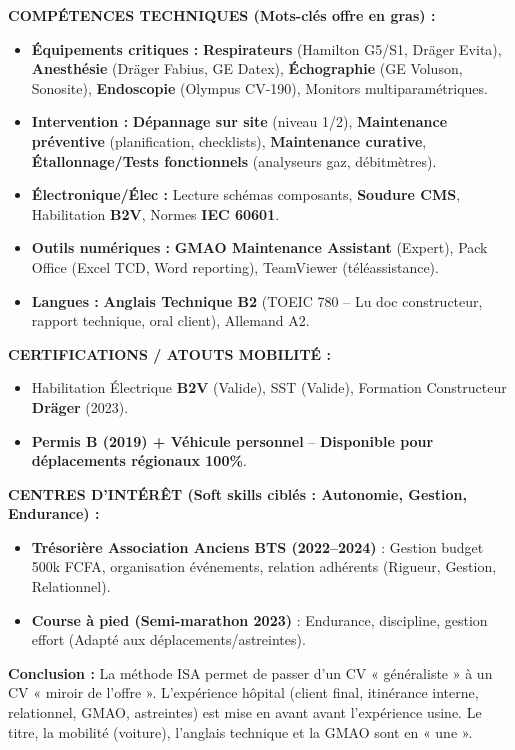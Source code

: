 \documentclass[11pt]{article}
\begin{document}
\begin{exoresolu}
    \textbf{COMPÉTENCES TECHNIQUES (Mots-clés offre en \textbf{gras}) :}
    \begin{itemize}
        \item \textbf{Équipements critiques :} \textbf{Respirateurs} (Hamilton G5/S1, Dräger Evita), \textbf{Anesthésie} (Dräger Fabius, GE Datex), \textbf{Échographie} (GE Voluson, Sonosite), \textbf{Endoscopie} (Olympus CV-190), Monitors multiparamétriques.
        \item \textbf{Intervention :} \textbf{Dépannage sur site} (niveau 1/2), \textbf{Maintenance préventive} (planification, checklists), \textbf{Maintenance curative}, \textbf{Étallonnage/Tests fonctionnels} (analyseurs gaz, débitmètres).
        \item \textbf{Électronique/Élec :} Lecture schémas composants, \textbf{Soudure CMS}, Habilitation \textbf{B2V}, Normes \textbf{IEC 60601}.
        \item \textbf{Outils numériques :} \textbf{GMAO Maintenance Assistant} (Expert), Pack Office (Excel TCD, Word reporting), TeamViewer (téléassistance).
        \item \textbf{Langues :} \textbf{Anglais Technique B2} (TOEIC 780 -- Lu doc constructeur, rapport technique, oral client), Allemand A2.
    \end{itemize}

    \textbf{CERTIFICATIONS / ATOUTS MOBILITÉ :}
    \begin{itemize}
        \item Habilitation Électrique \textbf{B2V} (Valide), SST (Valide), Formation Constructeur \textbf{Dräger} (2023).
        \item \textbf{Permis B (2019) + Véhicule personnel} -- \textbf{Disponible pour déplacements régionaux 100\%}.
    \end{itemize}

    \textbf{CENTRES D'INTÉRÊT (Soft skills ciblés : Autonomie, Gestion, Endurance) :}
    \begin{itemize}
        \item \textbf{Trésorière Association Anciens BTS (2022--2024)} : Gestion budget 500k FCFA, organisation événements, relation adhérents (Rigueur, Gestion, Relationnel).
        \item \textbf{Course à pied (Semi-marathon 2023)} : Endurance, discipline, gestion effort (Adapté aux déplacements/astreintes).
    \end{itemize}

    \textbf{Conclusion :} La méthode ISA permet de passer d'un CV « généraliste » à un CV « miroir de l'offre ». L'expérience hôpital (client final, itinérance interne, relationnel, GMAO, astreintes) est mise en avant avant l'expérience usine. Le titre, la mobilité (voiture), l'anglais technique et la GMAO sont en « une ».
\end{exoresolu}
\end{document}
